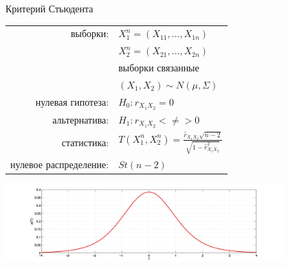 \documentclass[9pt,pdf,utf8,hyperref={unicode},aspectratio=169]{beamer}
\begin{document}
\begin{frame}{Критерий Стьюдента}

		\begin{center}
			\begin{tabular}{rl}
				выборки:                        & $X_1^n=\left(X_{11},\ldots,X_{1n}\right)$\\
				                                & $X_2^n=\left(X_{21},\ldots,X_{2n}\right)$\\
				                                & выборки связанные\\
				                                & $\left(X_{1},X_{2}\right)\sim N\left(\mu,\Sigma\right)$ \\
				нулевая гипотеза:               & $H_0\colon r_{X_1X_2}=0$ \\
				альтернатива:                   & $H_1\colon r_{X_1X_2}<\neq>0$ \\
				статистика:                     & $T\left(X_1^n, X_2^n\right) = \frac{\hat{r}_{X_1X_2} \sqrt{n-2}}{\sqrt{1-\hat{r}^2_{X_1X_2}}}$ \\
				нулевое распределение:          & $St(n-2)$\\
			\end{tabular}
			\includegraphics[width=0.8\textwidth]{stud.png}
		\end{center}
\end{frame}
\end{document}
